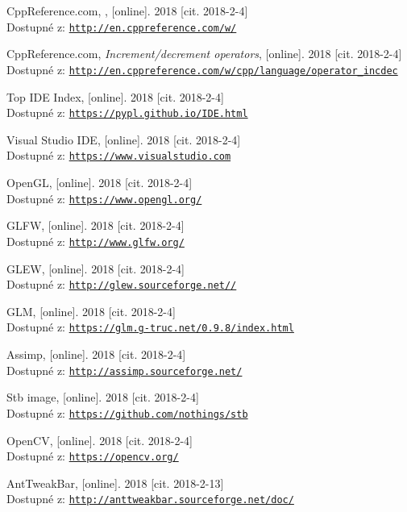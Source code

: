 \documentclass[czech,public,dept460,male,cpdeclaration]{diploma}
\begin{document}
\begin{thebibliography}{99}
	 CppReference.com,
		, [online]. 2018 [cit. 2018-2-4]\\
		Dostupné z: \href{http://en.cppreference.com/w/}{\texttt{http://en.cppreference.com/w/}}
		
	 CppReference.com,
		\textit{Increment/decrement operators}, [online]. 2018 [cit. 2018-2-4]\\
		Dostupné z: \href{http://en.cppreference.com/w/cpp/language/operator\_incdec}{\texttt{http://en.cppreference.com/w/cpp/language/operator\_incdec}}
		
	 Top IDE Index,
		[online]. 2018 [cit. 2018-2-4]\\
		Dostupné z: \href{https://pypl.github.io/IDE.html}{\texttt{https://pypl.github.io/IDE.html}}
		
	 Visual Studio IDE,
		[online]. 2018 [cit. 2018-2-4]\\
		Dostupné z: \href{https://www.visualstudio.com}{\texttt{https://www.visualstudio.com}}
		
	 OpenGL,
		[online]. 2018 [cit. 2018-2-4]\\
		Dostupné z: \href{https://www.opengl.org/}{\texttt{https://www.opengl.org/}}
		
	 GLFW,
		[online]. 2018 [cit. 2018-2-4]\\
		Dostupné z: \href{http://www.glfw.org/}{\texttt{http://www.glfw.org/}}
		
	 GLEW,
		[online]. 2018 [cit. 2018-2-4]\\
		Dostupné z: \href{http://glew.sourceforge.net/}{\texttt{http://glew.sourceforge.net//}}
		
	 GLM,
		[online]. 2018 [cit. 2018-2-4]\\
		Dostupné z: \href{https://glm.g-truc.net/0.9.8/index.html}{\texttt{https://glm.g-truc.net/0.9.8/index.html}}
		
	 Assimp,
		[online]. 2018 [cit. 2018-2-4]\\
		Dostupné z: \href{http://assimp.sourceforge.net/}{\texttt{http://assimp.sourceforge.net/}}
		
	 Stb image,
		[online]. 2018 [cit. 2018-2-4]\\
		Dostupné z: \href{https://github.com/nothings/stb}{\texttt{https://github.com/nothings/stb}}
		
	 OpenCV,
		[online]. 2018 [cit. 2018-2-4]\\
		Dostupné z: \href{https://opencv.org/}{\texttt{https://opencv.org/}}
		
	 AntTweakBar,
		[online]. 2018 [cit. 2018-2-13]\\
		Dostupné z: \href{http://anttweakbar.sourceforge.net/doc/}{\texttt{http://anttweakbar.sourceforge.net/doc/}}
		
\end{thebibliography}
\end{document}
